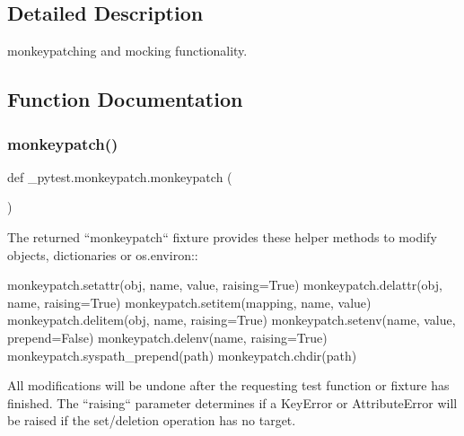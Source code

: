 \subsection{Detailed Description}
\begin{DoxyVerb}monkeypatching and mocking functionality.  \end{DoxyVerb}
 

\subsection{Function Documentation}
\mbox{\label{namespace__pytest_1_1monkeypatch_a68649128026af8df237c5c5d5dea5e42}} 
\subsubsection{\texorpdfstring{monkeypatch()}{monkeypatch()}}
{\footnotesize\ttfamily def \+\_\+pytest.\+monkeypatch.\+monkeypatch (\begin{DoxyParamCaption}{ }\end{DoxyParamCaption})}

\begin{DoxyVerb}The returned ``monkeypatch`` fixture provides these
helper methods to modify objects, dictionaries or os.environ::

    monkeypatch.setattr(obj, name, value, raising=True)
    monkeypatch.delattr(obj, name, raising=True)
    monkeypatch.setitem(mapping, name, value)
    monkeypatch.delitem(obj, name, raising=True)
    monkeypatch.setenv(name, value, prepend=False)
    monkeypatch.delenv(name, raising=True)
    monkeypatch.syspath_prepend(path)
    monkeypatch.chdir(path)

All modifications will be undone after the requesting
test function or fixture has finished. The ``raising``
parameter determines if a KeyError or AttributeError
will be raised if the set/deletion operation has no target.
\end{DoxyVerb}
 